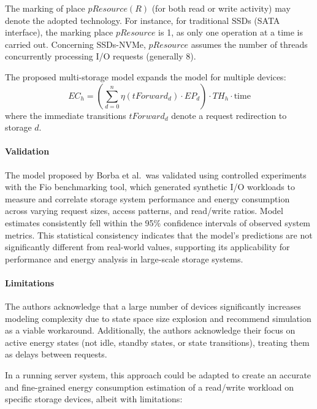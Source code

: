 The marking of place $pResource (R)$ (for both read or write activity) may denote the adopted technology. For instance, for traditional SSDs (SATA interface), the marking place $pResource$ is 1, as only one operation at a time is carried out. Concerning SSDs-NVMe, $pResource$ assumes the number of threads concurrently processing I/O requests (generally 8).

The proposed multi-storage model expands the model for multiple devices:
\begin{equation}
    EC_h = \left( \sum_{d=0}^{n} \eta(tForward_d) \cdot EP_d \right) \cdot TH_h \cdot \text{time}
\end{equation}
where the immediate transitions $tForward_d$ denote a request redirection to storage $d$.

\paragraph{Validation}

The model proposed by Borba et al.\ was validated using controlled experiments with the Fio benchmarking tool, which generated synthetic I/O workloads to measure and correlate storage system performance and energy consumption across varying request sizes, access patterns, and read/write ratios. Model estimates consistently fell within the 95\% confidence intervals of observed system metrics. This statistical consistency indicates that the model's predictions are not significantly different from real-world values, supporting its applicability for performance and energy analysis in large-scale storage systems.

\paragraph{Limitations}

The authors acknowledge that a large number of devices significantly increases modeling complexity due to state space size explosion and recommend simulation as a viable workaround. Additionally, the authors acknowledge their focus on active energy states (not idle, standby states, or state transitions), treating them as delays between requests.

In a running server system, this approach could be adapted to create an accurate and fine-grained energy consumption estimation of a read/write workload on specific storage devices, albeit with limitations:

